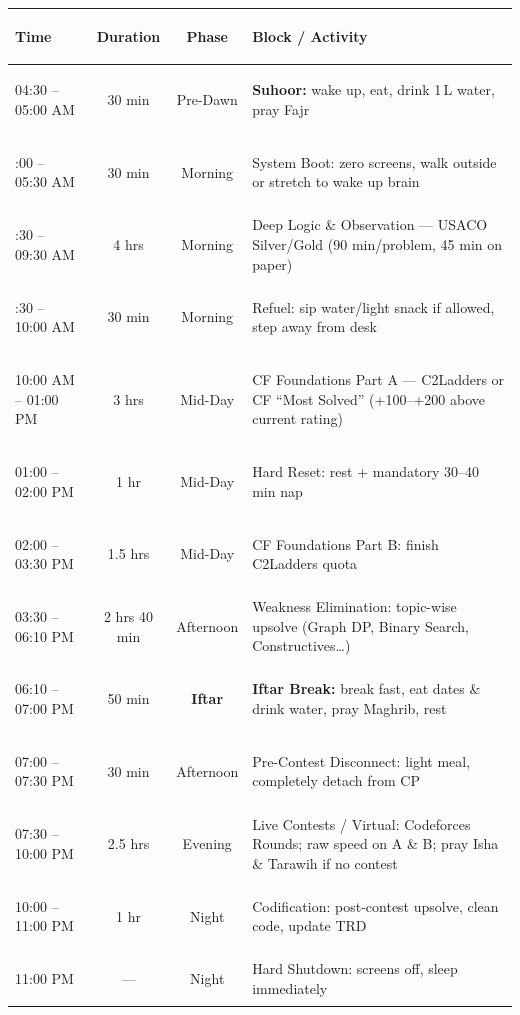 \documentclass[12pt, a4paper]{article}
\begin{document}
\vspace{0.8em}
{%
\renewcommand{\arraystretch}{1.5}
\begin{tabularx}{\textwidth}{|%
  >{\bfseries\raggedright\arraybackslash}p{3.4cm}|%
  c|%
  c|%
  >{\raggedright\arraybackslash}X|%
}
\hline
\rowcolor{primary!90!black}
{\color{white}\centering\textbf{Time}} &
{\color{white}\textbf{Duration}} &
{\color{white}\textbf{Phase}} &
{\color{white}\centering\arraybackslash\textbf{Block / Activity}} \\
\hline
\rowcolor{yellow!20}
04:30 -- 05:00 AM & 30 min & Pre-Dawn &
  \textbf{Suhoor:} wake up, eat, drink 1\,L water, pray Fajr \\
\hline
05:00 -- 05:30 AM & 30 min & Morning &
  System Boot: zero screens, walk outside or stretch to wake up brain \\
\hline
05:30 -- 09:30 AM & 4 hrs & Morning &
  Deep Logic \& Observation --- USACO Silver/Gold (90 min/problem, 45 min on paper) \\
\hline
09:30 -- 10:00 AM & 30 min & Morning &
  Refuel: sip water/light snack if allowed, step away from desk \\
\hline
\rowcolor{blue!6}
10:00 AM -- 01:00 PM & 3 hrs & Mid-Day &
  CF Foundations Part A --- C2Ladders or CF ``Most Solved'' (+100--+200 above current rating) \\
\hline
\rowcolor{blue!6}
01:00 -- 02:00 PM & 1 hr & Mid-Day &
  Hard Reset: rest + mandatory 30--40 min nap \\
\hline
\rowcolor{blue!6}
02:00 -- 03:30 PM & 1.5 hrs & Mid-Day &
  CF Foundations Part B: finish C2Ladders quota \\
\hline
\rowcolor{orange!8}
03:30 -- 06:10 PM & 2 hrs 40 min & Afternoon &
  Weakness Elimination: topic-wise upsolve (Graph DP, Binary Search, Constructives\ldots) \\
\hline
\rowcolor{yellow!25}
06:10 -- 07:00 PM & 50 min & \textbf{Iftar} &
  \textbf{Iftar Break:} break fast, eat dates \& drink water, pray Maghrib, rest \\
\hline
\rowcolor{orange!8}
07:00 -- 07:30 PM & 30 min & Afternoon &
  Pre-Contest Disconnect: light meal, completely detach from CP \\
\hline
\rowcolor{green!6}
07:30 -- 10:00 PM & 2.5 hrs & Evening &
  Live Contests / Virtual: Codeforces Rounds; raw speed on A \& B; pray Isha \& Tarawih if no contest \\
\hline
\rowcolor{gray!10}
10:00 -- 11:00 PM & 1 hr & Night &
  Codification: post-contest upsolve, clean code, update TRD \\
\hline
\rowcolor{gray!10}
11:00 PM & --- & Night &
  Hard Shutdown: screens off, sleep immediately \\
\hline
\end{tabularx}
}
\vspace{0.8em}
\end{document}
